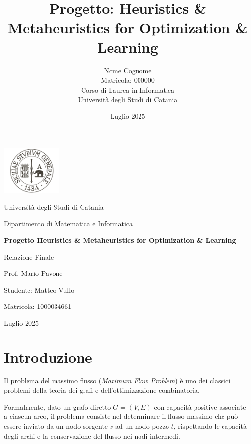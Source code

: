 \documentclass[12pt,a4paper]{article}
\title{\textbf{Progetto: Heuristics \& Metaheuristics for Optimization \& Learning}}
\author{
    Nome Cognome\\
    Matricola: 000000\\
    Corso di Laurea in Informatica\\
    Università degli Studi di Catania
}
\date{Luglio 2025}
\begin{document}
\begin{titlepage}
    \centering
    
    {\includegraphics[width=3cm]{sigillo-2014.png}\par} 
    \vspace{1cm}

    {\Large Università degli Studi di Catania\par}
    {\large Dipartimento di Matematica e Informatica\par}
    \vspace{2cm}

    {\LARGE\bfseries Progetto Heuristics \& Metaheuristics for Optimization \& Learning\par}
    \vspace{1.5cm}

    {\Large Relazione Finale\par}
    \vspace{2cm}

    {\Large Prof. Mario Pavone\par}
    \vspace{1cm}

    {\Large Studente: Matteo Vullo\par}
    {\Large Matricola: 1000034661\par}
    \vfill

    {\large Luglio 2025\par}
\end{titlepage}

\tableofcontents
\newpage

\section{Introduzione}

Il problema del massimo flusso (\textit{Maximum Flow Problem}) è uno dei classici problemi della teoria dei grafi e dell’ottimizzazione combinatoria.

Formalmente, dato un grafo diretto $ G = (V, E) $ con capacità positive associate a ciascun arco, il problema consiste nel determinare il flusso massimo che può essere inviato da un nodo sorgente $ s $ ad un nodo pozzo $ t $, rispettando le capacità degli archi e la conservazione del flusso nei nodi intermedi.
\end{document}
